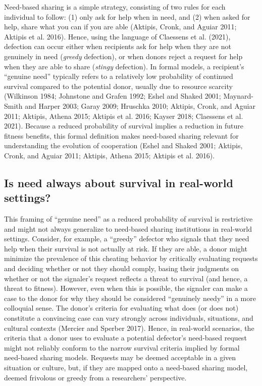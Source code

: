 \documentclass[
]{article}
\begin{document}
Need-based sharing is a simple strategy, consisting of two rules for each individual to follow: (1) only ask for help when in need, and (2) when asked for help, share what you can if you are able (Aktipis, Cronk, and Aguiar 2011; Aktipis et al. 2016). Hence, using the language of Claessens et al. (2021), defection can occur either when recipients ask for help when they are not genuinely in need (\emph{greedy} defection), or when donors reject a request for help when they are able to share (\emph{stingy} defection). In formal models, a recipient's ``genuine need'' typically refers to a relatively low probability of continued survival compared to the potential donor, usually due to resource scarcity (Wilkinson 1984; Johnstone and Grafen 1992; Eshel and Shaked 2001; Maynard-Smith and Harper 2003; Garay 2009; Hruschka 2010; Aktipis, Cronk, and Aguiar 2011; Aktipis, Athena 2015; Aktipis et al. 2016; Kayser 2018; Claessens et al. 2021). Because a reduced probability of survival implies a reduction in future fitness benefits, this formal definition makes need-based sharing relevant for understanding the evolution of cooperation (Eshel and Shaked 2001; Aktipis, Cronk, and Aguiar 2011; Aktipis, Athena 2015; Aktipis et al. 2016).

\subsection{Is need always about survival in real-world settings?}

This framing of ``genuine need'' as a reduced probability of survival is restrictive and might not always generalize to need-based sharing institutions in real-world settings. Consider, for example, a ``greedy'' defector who signals that they need help when their survival is not actually at risk. If they are able, a donor might minimize the prevalence of this cheating behavior by critically evaluating requests and deciding whether or not they should comply, basing their judgments on whether or not the signaler's request reflects a threat to survival (and hence, a threat to fitness). However, even when this is possible, the signaler can make a case to the donor for why they should be considered ``genuinely needy'' in a more colloquial sense. The donor's criteria for evaluating what does (or does not) constitute a convincing case can vary strongly across individuals, situations, and cultural contexts (Mercier and Sperber 2017). Hence, in real-world scenarios, the criteria that a donor uses to evaluate a potential defector's need-based request might not reliably conform to the narrow survival criteria implied by formal need-based sharing models. Requests may be deemed acceptable in a given situation or culture, but, if they are mapped onto a need-based sharing model, deemed frivolous or greedy from a researchers' perspective.
\end{document}
